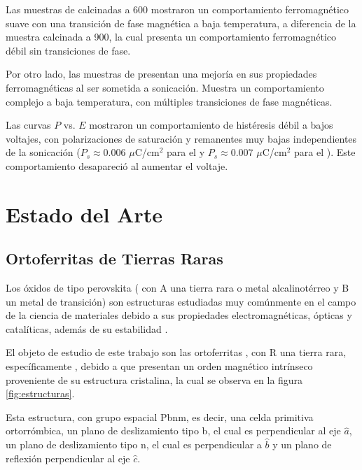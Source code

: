 \documentclass[../main.tex]{subfiles}
\begin{document}
Las muestras de \neod{} calcinadas a 600\gradoC{} mostraron un comportamiento ferromagnético suave con una transición de fase magnética a baja temperatura, a diferencia de la muestra calcinada a 900\gradoC{}, la cual presenta un comportamiento ferromagnético débil sin transiciones de fase.

Por otro lado, las muestras de \sama{} presentan una mejoría en sus propiedades ferromagnéticas al ser sometida a sonicación. Muestra un comportamiento complejo a baja temperatura, con múltiples transiciones de fase magnéticas.

Las curvas $P$ vs. $E$ mostraron un comportamiento de histéresis débil a bajos voltajes, con polarizaciones de saturación y remanentes muy bajas independientes de la sonicación ($P_s\approx 0.006$ $\mu$C/cm$^2$ para el \neod{} y $P_s\approx 0.007$ $\mu$C/cm$^2$ para el \sama{}). Este comportamiento desapareció al aumentar el voltaje.
\chapter{Estado del Arte}
\section{Ortoferritas de Tierras Raras}
Los óxidos de tipo perovskita ( con A una tierra rara o metal alcalinotérreo y B un metal de transición) son estructuras estudiadas muy comúnmente en el campo de la ciencia de materiales debido a sus propiedades electromagnéticas, ópticas y catalíticas, además de su estabilidad \cite{Wang2019}.

El objeto de estudio de este trabajo son las ortoferritas , con R una tierra rara, específicamente , debido a que presentan un orden magnético intrínseco proveniente de su estructura cristalina, la cual se observa en la figura \ref{fig:estructuras}. 

Esta estructura, con grupo espacial Pbnm, es decir, una celda primitiva ortorrómbica, un plano de deslizamiento tipo b, el cual es perpendicular al eje $\hat{a}$, un plano de deslizamiento tipo n, el cual es perpendicular a $\hat{b}$ y un plano de reflexión perpendicular al eje $\hat{c}$.
\end{document}
